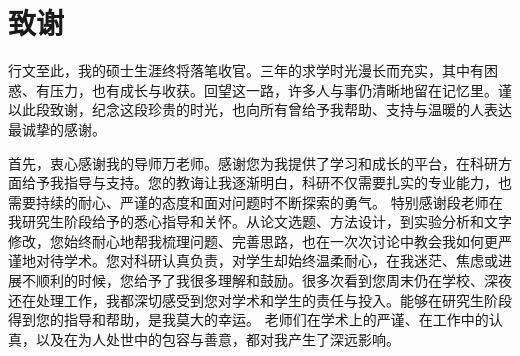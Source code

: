 \chapter*{致\quad\quad 谢}









行文至此，我的硕士生涯终将落笔收官。三年的求学时光漫长而充实，其中有困惑、有压力，也有成长与收获。回望这一路，许多人与事仍清晰地留在记忆里。谨以此段致谢，纪念这段珍贵的时光，也向所有曾给予我帮助、支持与温暖的人表达最诚挚的感谢。

首先，衷心感谢我的导师万老师。感谢您为我提供了学习和成长的平台，在科研方面给予我指导与支持。您的教诲让我逐渐明白，科研不仅需要扎实的专业能力，也需要持续的耐心、严谨的态度和面对问题时不断探索的勇气。
特别感谢段老师在我研究生阶段给予的悉心指导和关怀。从论文选题、方法设计，到实验分析和文字修改，您始终耐心地帮我梳理问题、完善思路，也在一次次讨论中教会我如何更严谨地对待学术。您对科研认真负责，对学生却始终温柔耐心，在我迷茫、焦虑或进展不顺利的时候，您给予了我很多理解和鼓励。很多次看到您周末仍在学校、深夜还在处理工作，我都深切感受到您对学术和学生的责任与投入。能够在研究生阶段得到您的指导和帮助，是我莫大的幸运。
老师们在学术上的严谨、在工作中的认真，以及在为人处世中的包容与善意，都对我产生了深远影响。


